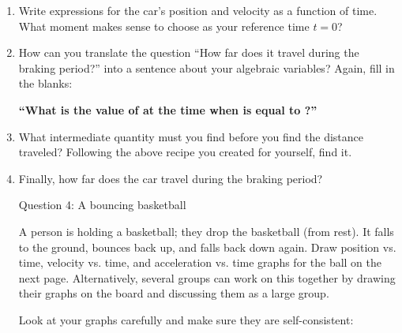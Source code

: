 \documentclass[12pt]{article}
\def\BS{\bigskip}
\begin{document}
\begin{enumerate}
	\item Write expressions for the car's position and velocity as a function of time. What moment makes sense to choose as your reference time $t=0$?
	
	\vspace{1in}
	
	
	\item How can you translate the question ``How far does it travel during the braking period?'' into a sentence about your algebraic variables? Again, fill in the blanks: 
	
	\begin{center}
		{\bf ``What is the value of \underline{\hspace{0.7in}} at the time when \underline{\hspace{0.7in}} is equal to \underline{\hspace{0.7in}}?''} 
	\end{center}
	
	
	\item What intermediate quantity must you find before you find the distance traveled? Following the above recipe you created for yourself, find it.
	
	
	
	
	\vspace{2in}
	
	
	
	
	
	\item Finally, how far does the car travel during the braking period?
	
	\newpage


\centerline{\Large Question 4: A bouncing basketball}

\BS

A person is holding a basketball; they drop the basketball (from rest). It falls to the ground, bounces back up, and falls back down again. Draw position vs. time, velocity vs. time, and acceleration vs. time graphs for the ball on the next page. Alternatively, several groups can work on this together by drawing their graphs on the board and discussing them as a large group.

Look at your graphs carefully and make sure they are self-consistent:



\end{enumerate}
\end{document}
